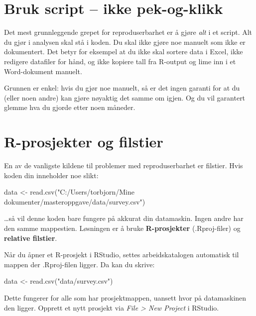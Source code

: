 \documentclass[
  norsk,
  letterpaper,
  DIV=11,
  numbers=noendperiod]{scrreprt}
\newenvironment{Shaded}{\begin{snugshade}}{\end{snugshade}}
\newcommand{\FunctionTok}[1]{\textcolor[rgb]{0.28,0.35,0.67}{#1}}
\newcommand{\NormalTok}[1]{\textcolor[rgb]{0.00,0.23,0.31}{#1}}
\newcommand{\OtherTok}[1]{\textcolor[rgb]{0.00,0.23,0.31}{#1}}
\newcommand{\StringTok}[1]{\textcolor[rgb]{0.13,0.47,0.30}{#1}}
\theoremstyle{definition}
\theoremstyle{remark}
\begin{document}
\section{Bruk script -- ikke
pek-og-klikk}\label{bruk-script-ikke-pek-og-klikk}

Det mest grunnleggende grepet for reproduserbarhet er å gjøre \emph{alt}
i et script. Alt du gjør i analysen skal stå i koden. Du skal ikke gjøre
noe manuelt som ikke er dokumentert. Det betyr for eksempel at du ikke
skal sortere data i Excel, ikke redigere datafiler for hånd, og ikke
kopiere tall fra R-output og lime inn i et Word-dokument manuelt.

Grunnen er enkel: hvis du gjør noe manuelt, så er det ingen garanti for
at du (eller noen andre) kan gjøre nøyaktig det samme om igjen. Og du
vil garantert glemme hva du gjorde etter noen måneder.

\section{R-prosjekter og filstier}\label{r-prosjekter-og-filstier}

En av de vanligste kildene til problemer med reproduserbarhet er
filstier. Hvis koden din inneholder noe slikt:

\begin{Shaded}
\begin{Highlighting}[]
\NormalTok{data }\OtherTok{\textless{}{-}} \FunctionTok{read.csv}\NormalTok{(}\StringTok{"C:/Users/torbjorn/Mine dokumenter/masteroppgave/data/survey.csv"}\NormalTok{)}
\end{Highlighting}
\end{Shaded}

\ldots så vil denne koden bare fungere på akkurat din datamaskin. Ingen
andre har den samme mappestien. Løsningen er å bruke
\textbf{R-prosjekter} (.Rproj-filer) og \textbf{relative filstier}.

Når du åpner et R-prosjekt i RStudio, settes arbeidskatalogen automatisk
til mappen der .Rproj-filen ligger. Da kan du skrive:

\begin{Shaded}
\begin{Highlighting}[]
\NormalTok{data }\OtherTok{\textless{}{-}} \FunctionTok{read.csv}\NormalTok{(}\StringTok{"data/survey.csv"}\NormalTok{)}
\end{Highlighting}
\end{Shaded}

Dette fungerer for alle som har prosjektmappen, uansett hvor på
datamaskinen den ligger. Opprett et nytt prosjekt via \emph{File
\textgreater{} New Project} i RStudio.
\end{document}
